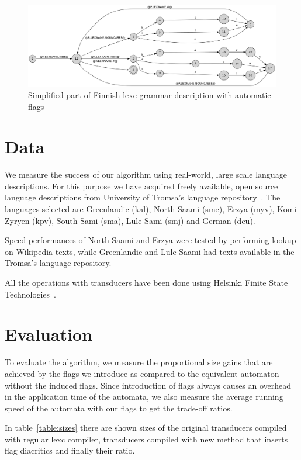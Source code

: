 \documentclass[11pt]{article}
\begin{document}
\begin{figure}
    \includegraphics[width=\textwidth]{transducer.png}
     \caption{Simplified part of Finnish lexc grammar description with automatic flags
     \label{fig:lexc-fin-flag}}
\end{figure}

\section{Data}
\label{sec:data}

We measure the success of our algorithm using real-world, large scale language
descriptions. For this purpose we have acquired freely available, open source
language descriptions from University of Tromsa's language 
repository~\cite{moshagen2013building}. The languages selected are Greenlandic (kal), 
North Saami (sme), Erzya (myv), Komi Zyryen (kpv), South Sami (sma), Lule Sami (smj) and German (deu).

Speed performances of North Saami and Erzya were tested by performing lookup on Wikipedia texts, while Greenlandic and Lule Saami had texts available
 in the Tromsa's language repository.
 
 All the operations with transducers have been done using Helsinki Finite State Technologies~\cite{linden2011}.



\section{Evaluation}
\label{sec:evaluation}

To evaluate the algorithm, we measure the proportional size gains that are
achieved by the flags we introduce as compared to the equivalent automaton
without the induced flags. Since introduction of flags always causes an overhead in the
application time of the automata, we also measure the average running speed
of the automata with our flags to get the trade-off ratios.

In table~\ref{table:sizes} there are shown sizes of the original transducers compiled with regular lexc compiler, transducers compiled with new method that inserts flag diacritics and finally their ratio.
\end{document}
